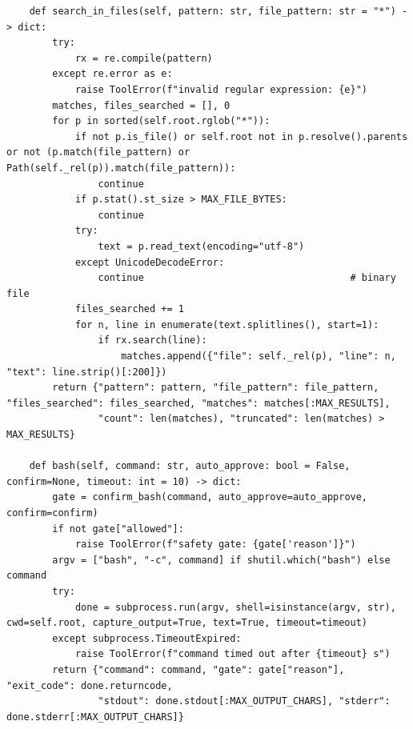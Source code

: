 \documentclass[11pt]{article}
\begin{document}
\begin{lstlisting}
    def search_in_files(self, pattern: str, file_pattern: str = "*") -> dict:
        try:
            rx = re.compile(pattern)
        except re.error as e:
            raise ToolError(f"invalid regular expression: {e}")
        matches, files_searched = [], 0
        for p in sorted(self.root.rglob("*")):
            if not p.is_file() or self.root not in p.resolve().parents or not (p.match(file_pattern) or Path(self._rel(p)).match(file_pattern)):
                continue
            if p.stat().st_size > MAX_FILE_BYTES:
                continue
            try:
                text = p.read_text(encoding="utf-8")
            except UnicodeDecodeError:
                continue                                    # binary file
            files_searched += 1
            for n, line in enumerate(text.splitlines(), start=1):
                if rx.search(line):
                    matches.append({"file": self._rel(p), "line": n, "text": line.strip()[:200]})
        return {"pattern": pattern, "file_pattern": file_pattern, "files_searched": files_searched, "matches": matches[:MAX_RESULTS],
                "count": len(matches), "truncated": len(matches) > MAX_RESULTS}

    def bash(self, command: str, auto_approve: bool = False, confirm=None, timeout: int = 10) -> dict:
        gate = confirm_bash(command, auto_approve=auto_approve, confirm=confirm)
        if not gate["allowed"]:
            raise ToolError(f"safety gate: {gate['reason']}")
        argv = ["bash", "-c", command] if shutil.which("bash") else command
        try:
            done = subprocess.run(argv, shell=isinstance(argv, str), cwd=self.root, capture_output=True, text=True, timeout=timeout)
        except subprocess.TimeoutExpired:
            raise ToolError(f"command timed out after {timeout} s")
        return {"command": command, "gate": gate["reason"], "exit_code": done.returncode,
                "stdout": done.stdout[:MAX_OUTPUT_CHARS], "stderr": done.stderr[:MAX_OUTPUT_CHARS]}
\end{lstlisting}
\endgroup
\end{document}
